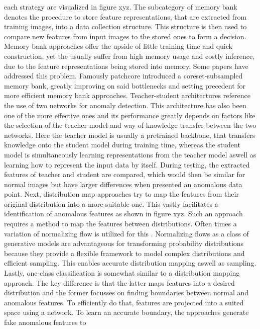 each strategy are visualized in figure xyz. The subcategory of 
memory bank denotes the procedure to store feature representations, that are extracted from training images, into a data collection structure. This structure is then used to compare new 
features from input images to the stored ones to form a decision. Memory bank approaches offer the upside of little training time and quick construction, yet the usually suffer from high memory 
usage and costly inference, due to the feature representations being stored into memory. Some papers have addressed this problem. Famously patchcore \cite{patchCore2022} introduced a coreset-subsampled 
memory bank, greatly improving on said bottlenecks and setting precedent for more efficient memory bank approaches. Teacher-student architectures reference the use of two networks for anomaly detection. 
This architecture has also been one of the more effective ones and its performance greatly depends on factors like the selection of the teacher model and way 
of knowledge transfer between the two networks. Here the teacher model is usually a pretrained 
backbone, that transfers knowledge onto the student model during training time, whereas the student model is simultaneously learning representations from the teacher model aswell as learning 
how to represent the input data by itself. During testing, the extracted features of teacher and student are compared, which would then be similar for normal images but have larger differences 
when presented an anomalous data point.
Next, distribution map approaches try to map the features from their original distribution into a more suitable one. This vastly facilitates a identification of anomalous features as shown in 
figure xyz. Such an approach requires a method to map the features between distributions. Often times a variation of normalizing flow is utilized for this \cite{liu2024deep}. 
Normalizing flows as a class of generative models \cite{Kobyzev_2021normalizingflowexplanation} are advantageous for transforming probability distributions because they provide a flexible 
framework to model complex distributions and efficient sampling. This enables accurate distribution mapping aswell as sampling. 
Lastly, one-class classification is 
somewhat similar to a distribution mapping approach. The key difference is that the latter maps features into a desired distribution and the former focusses on finding boundaries between normal 
and anomalous features. To efficiently do that, features are projected into a suited space using a network. To learn an accurate boundary, the approaches generate fake anomalous features to 
